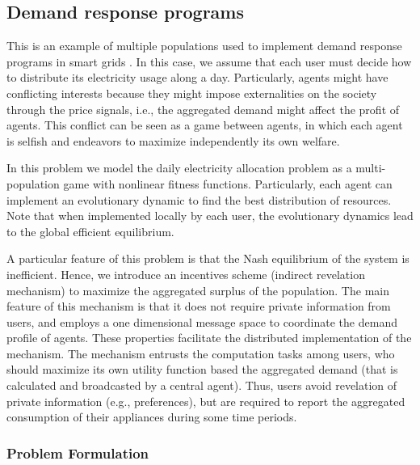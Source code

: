 \documentclass[a4paper,10pt]{article}
\begin{document}
\newpage
\subsection{Demand response programs}

This is an example of multiple populations used to implement demand response programs in smart grids \cite{barreto2013design, barreto2014incentives}. In this case, we assume that each user must decide how to distribute its electricity usage along a day. Particularly, 
agents might have conflicting interests because they might impose externalities on the society through the price signals, i.e., the aggregated demand might affect the profit of agents. This conflict can be seen as a game between agents, in which each agent is selfish and  endeavors to maximize independently its own welfare. 

In this problem we model the daily electricity allocation problem as a multi-population game with nonlinear fitness functions. Particularly, each agent can implement an evolutionary dynamic to find the best distribution of resources. Note that when implemented locally by each user, the evolutionary dynamics lead to the global efficient equilibrium.

A particular feature of this problem is that the Nash equilibrium of the system is inefficient. Hence, 
we introduce an incentives scheme (indirect revelation mechanism) to maximize the aggregated surplus of the population.
The main feature of this mechanism is that it does not require private information from users, and employs a one dimensional message space to coordinate the demand profile of agents. These properties facilitate the distributed implementation of the mechanism. The mechanism entrusts the computation tasks among users, who should maximize its own utility function based the aggregated demand (that is calculated and broadcasted by a central agent). Thus, users avoid revelation of private information (e.g., preferences), but are required to report the aggregated consumption of their appliances during some time periods.







\subsubsection{Problem Formulation}
\end{document}
